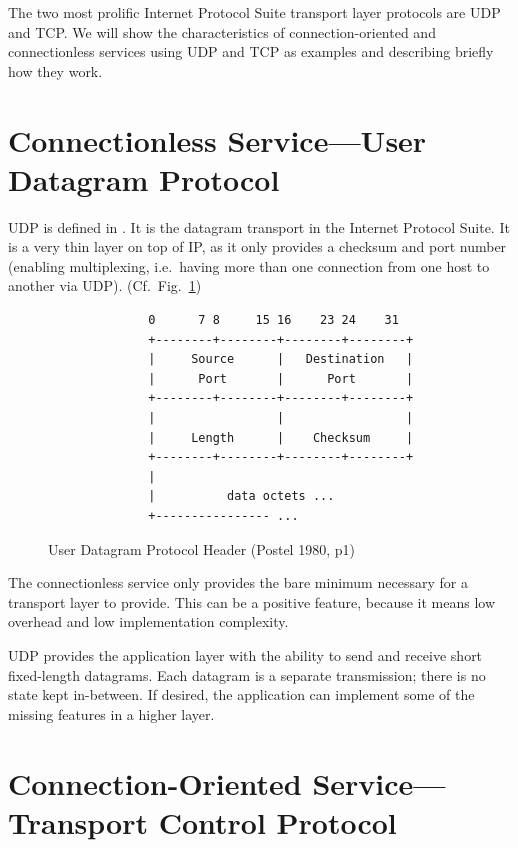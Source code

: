 \documentclass[10pt]{report}
\begin{document}
The two most prolific Internet Protocol Suite transport layer protocols are UDP
and TCP.  We will show the characteristics of connection-oriented and
connectionless services using UDP and TCP as examples and describing briefly how
they work.

\section{Connectionless Service---User Datagram Protocol}

UDP is defined in \cite{rfc768}.  It is the datagram transport in the
Internet Protocol Suite.  It is a very thin layer on top
of IP, as it only provides a checksum and port number (enabling
multiplexing, i.e.\ having more than one connection from one host to
another via UDP). (Cf.\ Fig.\ \ref{udpheader}) \cite{rfc1180}

\begin{figure}[h]
    \label{udpheader}
    \centering
	\begin{verbatim}
              0      7 8     15 16    23 24    31  
              +--------+--------+--------+--------+
              |     Source      |   Destination   |
              |      Port       |      Port       |
              +--------+--------+--------+--------+
              |                 |                 |
              |     Length      |    Checksum     |
              +--------+--------+--------+--------+
              |                                    
              |          data octets ...           
              +---------------- ...                
	\end{verbatim}
    \caption{User Datagram Protocol Header
	    (Postel 1980, p1) %
    }
\end{figure}

The connectionless service only provides the bare minimum necessary for
a transport layer to provide.  This can be a positive feature, because
it means low overhead and low implementation complexity.

UDP provides the application layer with the ability to send and receive short
fixed-length datagrams.   Each datagram is a separate transmission; there is no
state kept in-between.  If desired, the application can implement some of the
missing features in a higher layer.

\section{Connection-Oriented Service---Transport Control Protocol}
\end{document}

